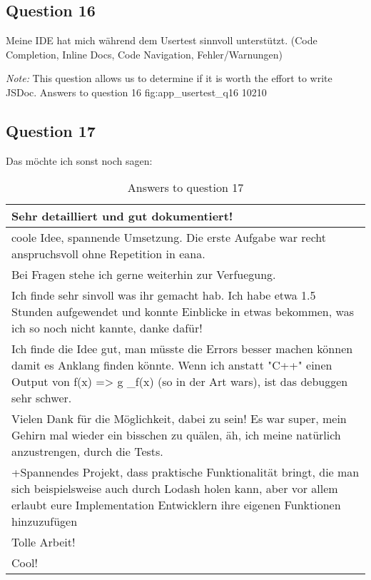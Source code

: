 \subsection*{Question 16}
\label{sub:ut_q16}
Meine IDE hat mich während dem Usertest sinnvoll unterstützt. (Code Completion,
Inline Docs, Code Navigation,  Fehler/Warnungen)

\textit{Note:} This question allows us to determine if it is worth the effort
to write JSDoc.
\likertbarchart
  {Answers to question 16}
  {fig:app_usertest_q16}
  {10}{2}{1}{0}

\subsection*{Question 17}
\label{sub:ut_q17}
Das möchte ich sonst noch sagen:
\begin{table}[H]
  \centering
  \begin{tabularx}{\textwidth}{| X |} \hline
    Sehr detailliert und gut dokumentiert! \\ \hline 
    coole Idee, spannende Umsetzung. Die erste Aufgabe war recht anspruchsvoll ohne Repetition in eana. \\ \hline 
    Bei Fragen stehe ich gerne weiterhin zur Verfuegung.\\ \hline 
    Ich finde sehr sinvoll was ihr gemacht hab. Ich habe etwa 1.5 Stunden aufgewendet und konnte Einblicke in etwas bekommen, was ich so noch nicht kannte, danke dafür! \\ \hline
    Ich finde die Idee gut, man müsste die Errors besser machen können damit es Anklang finden könnte. Wenn ich anstatt "C++" einen Output von f(x) => g \_f(x) (so in der Art wars), ist das debuggen sehr schwer. \\ \hline
    Vielen Dank für die Möglichkeit, dabei zu sein! Es war super, mein Gehirn mal wieder ein bisschen zu quälen, äh, ich meine natürlich anzustrengen, durch die Tests. \\ \hline
    +Spannendes Projekt, dass praktische Funktionalität bringt, die man sich beispielsweise auch durch Lodash holen kann, aber vor allem erlaubt eure Implementation Entwicklern ihre eigenen Funktionen hinzuzufügen \\ \hline
    Tolle Arbeit! \\ \hline
    Cool! \\ \hline

  \end{tabularx}
  \caption{Answers to question 17}
  \label{tab:app_usertest_q17}
\end{table}
